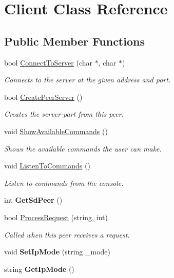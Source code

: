 \hypertarget{class_client}{}\section{Client Class Reference}
\label{class_client}
\subsection*{Public Member Functions}
\begin{DoxyCompactItemize}
\item 
bool \mbox{\hyperlink{class_client_a26c0b389de6fe436880792e53a839520}{Connect\+To\+Server}} (char $\ast$, char $\ast$)
\begin{DoxyCompactList}\small\item\em Connects to the server at the given address and port. \end{DoxyCompactList}\item 
bool \mbox{\hyperlink{class_client_aa25ebf4ae857f69835c281513fa5f173}{Create\+Peer\+Server}} ()
\begin{DoxyCompactList}\small\item\em Creates the server-\/part from this peer. \end{DoxyCompactList}\item 
\mbox{\label{class_client_a83fb10f02ae7889d82dbbf14b5e6b8ef}} 
void \mbox{\hyperlink{class_client_a83fb10f02ae7889d82dbbf14b5e6b8ef}{Show\+Available\+Commands}} ()
\begin{DoxyCompactList}\small\item\em Shows the available commands the user can make. \end{DoxyCompactList}\item 
\mbox{\label{class_client_a0ce7f1ab188209d1deb6ed794d703952}} 
void \mbox{\hyperlink{class_client_a0ce7f1ab188209d1deb6ed794d703952}{Listen\+To\+Commands}} ()
\begin{DoxyCompactList}\small\item\em Listen to commands from the console. \end{DoxyCompactList}\item 
\mbox{\label{class_client_aebf88f683281f67890aa3d7f1cc66967}} 
int {\bfseries Get\+Sd\+Peer} ()
\item 
bool \mbox{\hyperlink{class_client_a0d9d0b3787dc8991f4e748220cc2ae93}{Process\+Request}} (string, int)
\begin{DoxyCompactList}\small\item\em Called when this peer receives a request. \end{DoxyCompactList}\item 
\mbox{\label{class_client_a882283c65452d0b52bd2de2764bc3950}} 
void {\bfseries Set\+Ip\+Mode} (string \+\_\+mode)
\item 
\mbox{\label{class_client_a86746a15c7d19387e40805e7d55fa83a}} 
string {\bfseries Get\+Ip\+Mode} ()
\end{DoxyCompactItemize}
